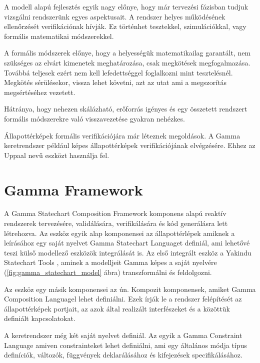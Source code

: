 A modell alapú fejlesztés egyik nagy előnye, hogy már tervezési fázisban tudjuk vizsgálni rendszerünk egyes aspektusait. A rendszer helyes működésének ellenőrzését verifikációnak hívják. Ez történhet tesztekkel, szimulációkkal, vagy formális matematikai módszerekkel.

A formális módszerek előnye, hogy a helyességük matematikailag garantált, nem szükséges az elvárt kimenetek meghatározása, csak megkötések megfogalmazása. Továbbá teljesek ezért nem kell lefedettséggel foglalkozni mint tesztelésnél. Megkötés sérülésekor, vissza lehet követni, azt az utat ami a megszorítás megsértéséhez vezetett.

Hátránya, hogy nehezen skálázható, erőforrás igényes és egy összetett rendszert formális módszerekre való visszavezetése gyakran nehézkes.

Állapottérképek formális verifikációjára már léteznek megoldások. A Gamma keretrendszer például képes állapottérképek verifikációjának elvégzésére. Ehhez az Uppaal \cite{bengtsson1995uppaal} \cite{bengtsson1998new} nevű eszközt használja fel.

\section{Gamma Framework\cite{gammaf}}

A Gamma Statechart Composition Framework komponens alapú reaktív rendszerek tervezésére, validálására, verifikálására és kód generálásra lett létrehozva. Az eszköz egyik alap komponensei az állapottérlépek amiknek a leírásához egy saját nyelvet Gamma Statechart Languaget definiál, ami lehetővé teszi külső modellező eszközök integrálását is. Az első integrált eszköz a Yakindu Statechart Tools \cite{toolsyakindu}, aminek a modelljeit Gamma képes a saját nyelvére (\ref{fig:gamma_statechart_model} ábra) transzformálni és feldolgozni.

Az eszköz egy másik komponensei az ún. Kompozit komponensek, amiket Gamma Composition Languagel lehet definiálni. Ezek írják le a rendszer felépítését az állapottérképek portjait, az azok által realizált interfészeket és a közöttük definiált kapcsolatokat.

A keretrendszer még két saját nyelvet definiál. Az egyik a Gamma Constraint Language amiven constrainteket lehet definiálni, ami egy általános módja típus definíciók, változók, függvények deklarálásához és kifejezések specifikálásához.

